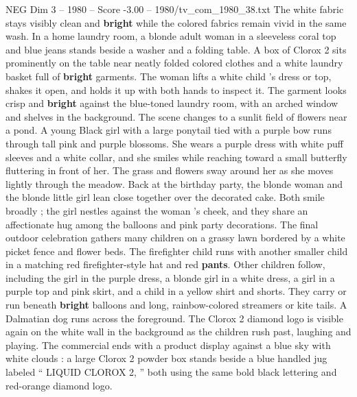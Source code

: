 \begin{textsample}{NEG Dim 3 – 1980 – Score -3.00 – 1980/tv\_com\_1980\_38.txt}
The white fabric stays visibly clean and \textbf{bright} while the colored fabrics remain vivid in the same wash.
In a home laundry room, a blonde adult woman in a sleeveless coral top and blue jeans stands beside a washer and a folding table.
A box of Clorox 2 sits prominently on the table near neatly folded colored clothes and a white laundry basket full of \textbf{bright} garments.
The woman lifts a white child ’s dress or top, shakes it open, and holds it up with both hands to inspect it.
The garment looks crisp and \textbf{bright} against the blue-toned laundry room, with an arched window and shelves in the background.
The scene changes to a sunlit field of flowers near a pond.
A young Black girl with a large ponytail tied with a purple bow runs through tall pink and purple blossoms.
She wears a purple dress with white puff sleeves and a white collar, and she smiles while reaching toward a small butterfly fluttering in front of her.
The grass and flowers sway around her as she moves lightly through the meadow.
Back at the birthday party, the blonde woman and the blonde little girl lean close together over the decorated cake.
Both smile broadly ; the girl nestles against the woman ’s cheek, and they share an affectionate hug among the balloons and pink party decorations.
The final outdoor celebration gathers many children on a grassy lawn bordered by a white picket fence and flower beds.
The firefighter child runs with another smaller child in a matching red firefighter-style hat and red \textbf{pants}.
Other children follow, including the girl in the purple dress, a blonde girl in a white dress, a girl in a purple top and pink skirt, and a child in a yellow shirt and shorts.
They carry or run beneath \textbf{bright} balloons and long, rainbow-colored streamers or kite tails.
A Dalmatian dog runs across the foreground.
The Clorox 2 diamond logo is visible again on the white wall in the background as the children rush past, laughing and playing.
The commercial ends with a product display against a blue sky with white clouds : a large Clorox 2 powder box stands beside a blue handled jug labeled “ LIQUID CLOROX 2, ” both using the same bold black lettering and red-orange diamond logo.

\end{textsample}
